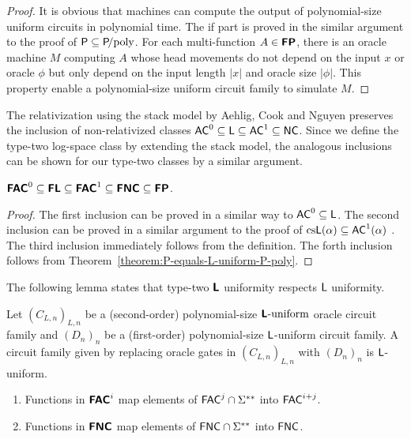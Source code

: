 \documentclass[envcountsect,envcountsame,orivec,oribibl]{llncs}
\begin{document}
\begin{proof}
 It is obvious that machines can compute the output of
 polynomial-size uniform circuits in polynomial time.
 The if part is proved in the similar argument to the proof of
 $\mathsf{P} \subseteq \mathsf{P}\!\text{/poly}$.
 For each multi-function $A \in \text{\bfseries \sffamily \upshape FP}$, there is an oracle machine $M$
 computing $A$ whose head movements do not depend on the input $x$ or oracle
 $\phi$ but only depend on the input length $|x|$ and oracle size $|\phi|$.
 This property enable a polynomial-size uniform circuit family to simulate $M$.
\end{proof}

The relativization using the stack model by Aehlig, Cook and Nguyen preserves
the inclusion of non-relativized classes
$\mathsf{AC}^0 \subseteq \mathsf{L} \subseteq \mathsf{AC}^1 \subseteq \mathsf{NC}$.
Since we define the type-two log-space class by extending the stack model,
the analogous inclusions can be shown for our type-two classes
by a similar argument. 

\begin{theorem}
\label{theorem:inclusion}
$ \text{\bfseries \sffamily \upshape FAC}^0
 \subseteq \text{\bfseries \sffamily \upshape FL} 
 \subseteq \text{\bfseries \sffamily \upshape FAC}^1
 \subseteq \text{\bfseries \sffamily \upshape FNC}
 \subseteq \text{\bfseries \sffamily \upshape FP}$. 
\end{theorem}

\begin{proof}
 The first inclusion can be proved in a similar way
 to $\mathsf{AC}^0 \subseteq \mathsf{L}$.
 The second inclusion can be proved in a similar argument to 
 the proof of $\text{cs}\mathsf{L}(\alpha) \subseteq \mathsf{AC}^1(\alpha)$
 \cite{aehlig2007relativizing}.
 The third inclusion immediately follows from the definition.
 The forth inclusion follows from Theorem~\ref{theorem:P-equals-L-uniform-P-poly}.
\end{proof}


The following lemma states that type-two $\text{\bfseries \sffamily \upshape L}$ uniformity respects
$\mathsf{L}$ uniformity.

\begin{lemma}
\label{lemma: respects uniformity}
 Let $(C_{L,n})_{L,n}$ be a (second-order) polynomial-size $\text{\bfseries \sffamily \upshape L}\text{-uniform}$ oracle circuit family
 and $(D_n)_n$ be a (first-order) polynomial-size $\mathsf{L}$-uniform circuit family.
 A circuit family given by replacing oracle gates in $(C_{L,n})_{L,n}$ with
 $(D_n)_n$ is $\mathsf{L}$-uniform.
\end{lemma}

\begin{corollary}
\label{corollary: type-one and type-two circuit classes}
\begin{enumerate}
 \item Functions in $\text{\bfseries \sffamily \upshape FAC}^i$ 
       map elements of $\mathsf{FAC}^j \cap \Sigma ^{**}$ 
       into $\mathsf{FAC}^{i+j}$.
 \item Functions in $\text{\bfseries \sffamily \upshape FNC}$
       map elements of $\mathsf{FNC} \cap \Sigma ^{**}$ 
       into $\mathsf{FNC}$.
\end{enumerate}
\end{corollary}
\end{document}
